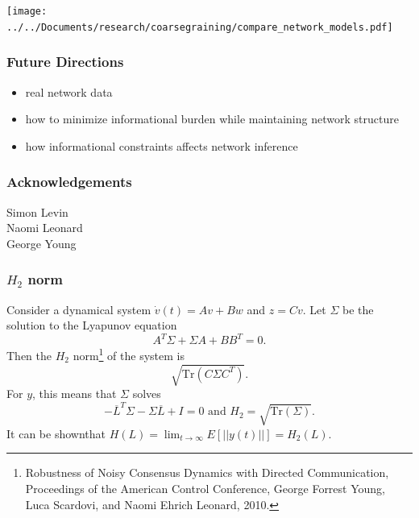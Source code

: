 \documentclass{beamer}
\newcommand{\tr}{\text{Tr}}
\begin{document}
\begin{frame}
\begin{center}
\texttt{[image: ../../Documents/research/coarsegraining/compare\_network\_models.pdf]}
\end{center}
\end{frame}


\begin{frame}
\frametitle{Future Directions}
\begin{itemize}
\item real network data
\item how to minimize informational burden while maintaining network structure
\item how informational constraints affects network inference
\end{itemize}
\end{frame}


\begin{frame}
\frametitle{Acknowledgements}
Simon Levin
\\Naomi Leonard
\\George Young
\end{frame}

\begin{frame}
\frametitle{$H_2$ norm}
Consider a dynamical system $\dot{v}(t)=Av+Bw$ and $z=Cv$.  Let $\Sigma$ be the solution to the Lyapunov equation $$A^T\Sigma+\Sigma A+BB^T=0.$$  Then the 
$H_2$ norm\footnote{Robustness of Noisy Consensus Dynamics with Directed Communication, Proceedings of the American Control Conference, George Forrest Young, Luca Scardovi, and Naomi Ehrich Leonard, 2010. } of the system is 
$$\sqrt{\tr(C\Sigma C^T)}.$$ 
For $y$, this means that $\Sigma$ solves $$-\overline{L}^T\Sigma-\Sigma\overline{L}+I=0 \text{ and } H_2=\sqrt{\tr(\Sigma)}.$$
It can be shown\footnotemark[\value{footnote}] that $H(L)=\lim_{t\to\infty}E[||y(t)||]=H_2(L).$

\end{frame}
\end{document}

